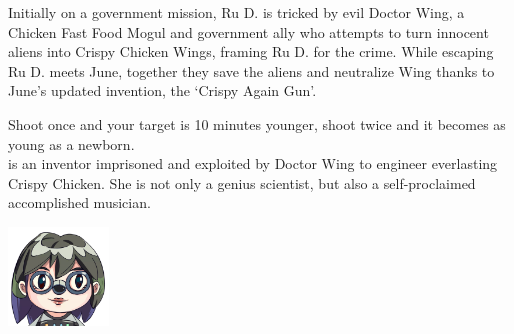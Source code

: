 Initially on a government mission, Ru D. is tricked by evil Doctor Wing, a Chicken Fast Food Mogul and government ally who attempts to turn innocent aliens into Crispy Chicken Wings, framing Ru D. for the crime. While escaping Ru D. meets June, together they save the aliens and neutralize Wing thanks to June's updated invention, the `Crispy Again Gun'.

Shoot once and your target is 10 minutes younger, shoot twice and it becomes as young as a newborn.\\

 is an inventor imprisoned and exploited by Doctor Wing to engineer everlasting Crispy Chicken. She is not only a genius scientist, but also a self-proclaimed accomplished musician.

\begin{center}
\includegraphics[width=0.2\textwidth]{Assets/june-head}
\end{center}



\clearpage